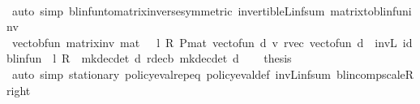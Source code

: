 \begin{isabellebody}
\ \ \ \ \isamarkupfalse%
\ {\isacharparenleft}{\kern0pt}auto\ simp{\isacharcolon}{\kern0pt}\ blinfun{\isacharunderscore}{\kern0pt}to{\isacharunderscore}{\kern0pt}matrix{\isacharunderscore}{\kern0pt}inverse{\isacharparenleft}{\kern0pt}{}{\isacharparenright}{\kern0pt}{\isacharbrackleft}{\kern0pt}symmetric{\isacharbrackright}{\kern0pt}\ invertible\isactrlsub L{\isacharunderscore}{\kern0pt}inf{\isacharunderscore}{\kern0pt}sum\ matrix{\isacharunderscore}{\kern0pt}to{\isacharunderscore}{\kern0pt}blinfun{\isacharunderscore}{\kern0pt}inv{\isacharparenright}{\kern0pt}\isanewline
\ \ \isamarkupfalse%
\ \isamarkupfalse%
\ {\isachardoublequoteopen}vec{\isacharunderscore}{\kern0pt}to{\isacharunderscore}{\kern0pt}bfun\ {\isacharparenleft}{\kern0pt}matrix{\isacharunderscore}{\kern0pt}inv\ {\isacharparenleft}{\kern0pt}mat\ {}\ {\isacharminus}{\kern0pt}\ l\ {\isacharasterisk}{\kern0pt}\isactrlsub R\ {\isacharparenleft}{\kern0pt}P{\isacharunderscore}{\kern0pt}mat\ {\isacharparenleft}{\kern0pt}vec{\isacharunderscore}{\kern0pt}to{\isacharunderscore}{\kern0pt}fun\ d{\isacharparenright}{\kern0pt}{\isacharparenright}{\kern0pt}{\isacharparenright}{\kern0pt}\ {\isacharasterisk}{\kern0pt}v\ {\isacharparenleft}{\kern0pt}r{\isacharunderscore}{\kern0pt}vec{\isacharprime}{\kern0pt}\ {\isacharparenleft}{\kern0pt}vec{\isacharunderscore}{\kern0pt}to{\isacharunderscore}{\kern0pt}fun\ d{\isacharparenright}{\kern0pt}{\isacharparenright}{\kern0pt}{\isacharparenright}{\kern0pt}\ {\isacharequal}{\kern0pt}\ inv\isactrlsub L\ {\isacharparenleft}{\kern0pt}id{\isacharunderscore}{\kern0pt}blinfun\ {\isacharminus}{\kern0pt}\ l\ {\isacharasterisk}{\kern0pt}\isactrlsub R\ {\isasymP}\ {\isacharparenleft}{\kern0pt}mk{\isacharunderscore}{\kern0pt}dec{\isacharunderscore}{\kern0pt}det\ {\isacharquery}{\kern0pt}d{\isacharparenright}{\kern0pt}{\isacharparenright}{\kern0pt}\ {\isacharparenleft}{\kern0pt}r{\isacharunderscore}{\kern0pt}dec\isactrlsub b\ {\isacharparenleft}{\kern0pt}mk{\isacharunderscore}{\kern0pt}dec{\isacharunderscore}{\kern0pt}det\ {\isacharquery}{\kern0pt}d{\isacharparenright}{\kern0pt}{\isacharparenright}{\kern0pt}{\isachardoublequoteclose}\isacommand{{\isachardot}{\kern0pt}}\isamarkupfalse%
\isanewline
\ \ \isamarkupfalse%
\ {\isacharquery}{\kern0pt}thesis\isanewline
\ \ \ \ \isamarkupfalse%
\ {\isacharparenleft}{\kern0pt}auto\ simp{\isacharcolon}{\kern0pt}\ {\isasymnu}{\isacharunderscore}{\kern0pt}stationary\ policy{\isacharunderscore}{\kern0pt}eval{\isacharprime}{\kern0pt}{\isachardot}{\kern0pt}rep{\isacharunderscore}{\kern0pt}eq\ policy{\isacharunderscore}{\kern0pt}eval{\isacharunderscore}{\kern0pt}def\ inv\isactrlsub L{\isacharunderscore}{\kern0pt}inf{\isacharunderscore}{\kern0pt}sum\ blincomp{\isacharunderscore}{\kern0pt}scaleR{\isacharunderscore}{\kern0pt}right{\isacharparenright}{\kern0pt}\isanewline

\end{isabellebody}
